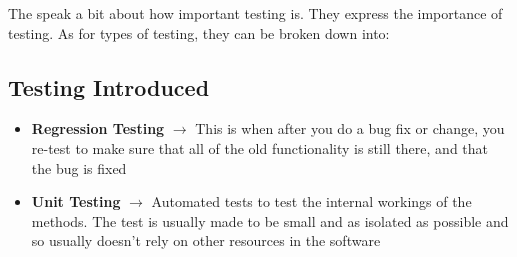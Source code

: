 \documentclass{article}
\begin{document}
The speak a bit about how important testing is. They express the importance of testing. As for types of testing, they can be broken down into:

\subsection{Testing Introduced}

\begin{itemize}
    \item \textbf{Regression Testing} $\longrightarrow$ This is when after you do a bug fix or change, you re-test to make sure that all of the old functionality is still there, and that the bug is fixed
    \item \textbf{Unit Testing} $\longrightarrow$ Automated tests to test the internal workings of the methods. The test is usually made to be small and as isolated as possible and so usually doesn't rely on other resources in the software
\end{itemize}
\end{document}
